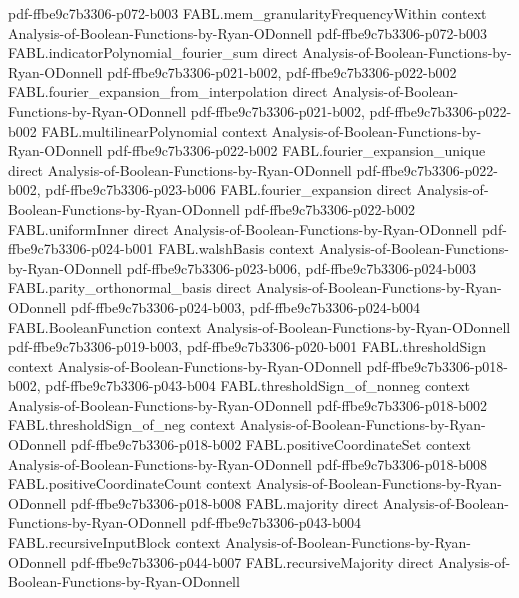 \begin{theorem}
  {pdf-ffbe9c7b3306-p072-b003}
\proofstep
  {FABL.mem_granularityFrequencyWithin}
  {context}
  {Analysis-of-Boolean-Functions-by-Ryan-ODonnell}
  {pdf-ffbe9c7b3306-p072-b003}
\proofstep
  {FABL.indicatorPolynomial_fourier_sum}
  {direct}
  {Analysis-of-Boolean-Functions-by-Ryan-ODonnell}
  {pdf-ffbe9c7b3306-p021-b002,
    pdf-ffbe9c7b3306-p022-b002}
\proofstep
  {FABL.fourier_expansion_from_interpolation}
  {direct}
  {Analysis-of-Boolean-Functions-by-Ryan-ODonnell}
  {pdf-ffbe9c7b3306-p021-b002,
    pdf-ffbe9c7b3306-p022-b002}
\proofstep
  {FABL.multilinearPolynomial}
  {context}
  {Analysis-of-Boolean-Functions-by-Ryan-ODonnell}
  {pdf-ffbe9c7b3306-p022-b002}
\proofstep
  {FABL.fourier_expansion_unique}
  {direct}
  {Analysis-of-Boolean-Functions-by-Ryan-ODonnell}
  {pdf-ffbe9c7b3306-p022-b002,
    pdf-ffbe9c7b3306-p023-b006}
\proofstep
  {FABL.fourier_expansion}
  {direct}
  {Analysis-of-Boolean-Functions-by-Ryan-ODonnell}
  {pdf-ffbe9c7b3306-p022-b002}
\proofstep
  {FABL.uniformInner}
  {direct}
  {Analysis-of-Boolean-Functions-by-Ryan-ODonnell}
  {pdf-ffbe9c7b3306-p024-b001}
\proofstep
  {FABL.walshBasis}
  {context}
  {Analysis-of-Boolean-Functions-by-Ryan-ODonnell}
  {pdf-ffbe9c7b3306-p023-b006,
    pdf-ffbe9c7b3306-p024-b003}
\proofstep
  {FABL.parity_orthonormal_basis}
  {direct}
  {Analysis-of-Boolean-Functions-by-Ryan-ODonnell}
  {pdf-ffbe9c7b3306-p024-b003,
    pdf-ffbe9c7b3306-p024-b004}
\proofstep
  {FABL.BooleanFunction}
  {context}
  {Analysis-of-Boolean-Functions-by-Ryan-ODonnell}
  {pdf-ffbe9c7b3306-p019-b003,
    pdf-ffbe9c7b3306-p020-b001}
\proofstep
  {FABL.thresholdSign}
  {context}
  {Analysis-of-Boolean-Functions-by-Ryan-ODonnell}
  {pdf-ffbe9c7b3306-p018-b002,
    pdf-ffbe9c7b3306-p043-b004}
\proofstep
  {FABL.thresholdSign_of_nonneg}
  {context}
  {Analysis-of-Boolean-Functions-by-Ryan-ODonnell}
  {pdf-ffbe9c7b3306-p018-b002}
\proofstep
  {FABL.thresholdSign_of_neg}
  {context}
  {Analysis-of-Boolean-Functions-by-Ryan-ODonnell}
  {pdf-ffbe9c7b3306-p018-b002}
\proofstep
  {FABL.positiveCoordinateSet}
  {context}
  {Analysis-of-Boolean-Functions-by-Ryan-ODonnell}
  {pdf-ffbe9c7b3306-p018-b008}
\proofstep
  {FABL.positiveCoordinateCount}
  {context}
  {Analysis-of-Boolean-Functions-by-Ryan-ODonnell}
  {pdf-ffbe9c7b3306-p018-b008}
\proofstep
  {FABL.majority}
  {direct}
  {Analysis-of-Boolean-Functions-by-Ryan-ODonnell}
  {pdf-ffbe9c7b3306-p043-b004}
\proofstep
  {FABL.recursiveInputBlock}
  {context}
  {Analysis-of-Boolean-Functions-by-Ryan-ODonnell}
  {pdf-ffbe9c7b3306-p044-b007}
\proofstep
  {FABL.recursiveMajority}
  {direct}
  {Analysis-of-Boolean-Functions-by-Ryan-ODonnell}

\end{theorem}

